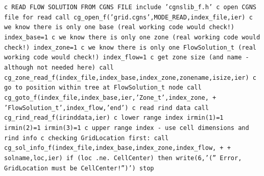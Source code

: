 \documentclass[12pt]{article}
\begin{document}
{\tt \noindent c  READ FLOW SOLUTION FROM CGNS FILE
\newline\indent      include 'cgnslib\_f.h'
\newline c  open CGNS file for read
\newline\indent      call cg\_open\_f('grid.cgns',MODE\_READ,index\_file,ier)
\newline c  we know there is only one base (real working code would check!)
\newline\indent      index\_base=1
\newline c  we know there is only one zone (real working code would check!)
\newline\indent      index\_zone=1
\newline c  we know there is only one FlowSolution\_t (real working code would check!)
\newline\indent      index\_flow=1
\newline c   get zone size (and name - although not needed here)
\newline\indent      call cg\_zone\_read\_f(index\_file,index\_base,index\_zone,zonename,isize,ier)
\newline c  go to position within tree at FlowSolution\_t node
\newline\indent      call cg\_goto\_f(index\_file,index\_base,ier,'Zone\_t',index\_zone,
\newline + \indent 'FlowSolution\_t',index\_flow,'end')
\newline c  read rind data
\newline\indent      call cg\_rind\_read\_f(irinddata,ier)
\newline c   lower range index
\newline\indent      irmin(1)=1
\newline\indent      irmin(2)=1
\newline\indent      irmin(3)=1
\newline c   upper range index - use cell dimensions and rind info
\newline c   checking GridLocation first:
\newline\indent      call cg\_sol\_info\_f(index\_file,index\_base,index\_zone,index\_flow,
\newline + \indent     + solname,loc,ier)
\newline\indent      if (loc .ne. CellCenter) then
\newline\indent\indent        write(6,'('' Error, GridLocation must be CellCenter!'')')
\newline\indent\indent        stop
}
\end{document}
